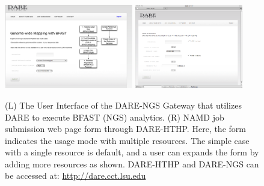 \documentclass[]{svjour3}
\begin{document}
\begin{figure}
 \centering
\includegraphics[width=0.5\textwidth]{figures/screenshot-ngs.png} \hspace{0.1in}
\includegraphics[width=0.42\textwidth]{figures/screenshot-hthp.png}
\caption{\small (L) The User Interface of the DARE-NGS Gateway that
 utilizes DARE to execute BFAST (NGS) analytics. (R) NAMD job
 submission web page form through DARE-HTHP. Here, the form indicates
 the usage mode with multiple resources. The simple case with a
 single resource is default, and a user can expands the form by
 adding more resources as shown. DARE-HTHP and DARE-NGS can be
 accessed at: \url{http://dare.cct.lsu.edu} }
 \label{fig:NAMD2}
\end{figure}

\end{document}
